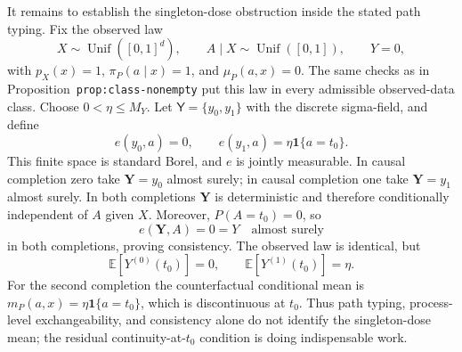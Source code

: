 It remains to establish the singleton-dose obstruction inside the stated path typing. Fix the observed law
\[
X\sim\operatorname{Unif}([0,1]^d),\qquad
A\mid X\sim\operatorname{Unif}([0,1]),\qquad Y=0,
\]
with \(p_X(x)=1\), \(\pi_P(a\mid x)=1\), and \(\mu_P(a,x)=0\). The same checks as in Proposition~\texttt{prop:class-nonempty} put this law in every admissible observed-data class. Choose \(0<\eta\le M_Y\). Let \(\mathsf Y=\{y_0,y_1\}\) with the discrete sigma-field, and define
\[
e(y_0,a)=0,
\qquad
e(y_1,a)=\eta\mathbf 1\{a=t_0\}.
\]
This finite space is standard Borel, and \(e\) is jointly measurable. In causal completion zero take \(\mathbf Y=y_0\) almost surely; in causal completion one take \(\mathbf Y=y_1\) almost surely. In both completions \(\mathbf Y\) is deterministic and therefore conditionally independent of \(A\) given \(X\). Moreover, \(P(A=t_0)=0\), so
\[
e(\mathbf Y,A)=0=Y
\quad\text{almost surely}
\]
in both completions, proving consistency. The observed law is identical, but
\[
\mathbb E[Y^{(0)}(t_0)]=0,
\qquad
\mathbb E[Y^{(1)}(t_0)]=\eta.
\]
For the second completion the counterfactual conditional mean is \(m_P(a,x)=\eta\mathbf 1\{a=t_0\}\), which is discontinuous at \(t_0\). Thus path typing, process-level exchangeability, and consistency alone do not identify the singleton-dose mean; the residual continuity-at-\(t_0\) condition is doing indispensable work.